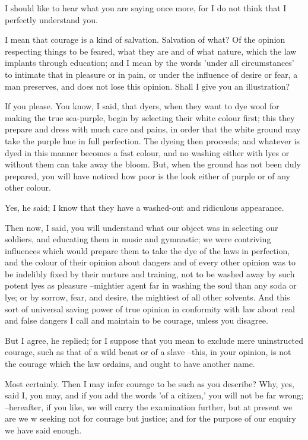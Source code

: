 I should like to hear what you are saying once more, for I do not think that I perfectly understand you.

I mean that courage is a kind of salvation.
Salvation of what?
Of the opinion respecting things to be feared, what they are and of what nature, which the law implants through education; and I mean by the words 'under all circumstances' to intimate that in pleasure or in pain, or under the influence of desire or fear, a man preserves, and does not lose this opinion. Shall I give you an illustration?

If you please.
You know, I said, that dyers, when they want to dye wool for making the true sea-purple, begin by selecting their white colour first; this they prepare and dress with much care and pains, in order that the white ground may take the purple hue in full perfection. The dyeing then proceeds; and whatever is dyed in this manner becomes a fast colour, and no washing either with lyes or without them can take away the bloom. But, when the ground has not been duly prepared, you will have noticed how poor is the look either of purple or of any other colour.

Yes, he said; I know that they have a washed-out and ridiculous appearance.

Then now, I said, you will understand what our object was in selecting our soldiers, and educating them in music and gymnastic; we were contriving influences which would prepare them to take the dye of the laws in perfection, and the colour of their opinion about dangers and of every other opinion was to be indelibly fixed by their nurture and training, not to be washed away by such potent lyes as pleasure --mightier agent far in washing the soul than any soda or lye; or by sorrow, fear, and desire, the mightiest of all other solvents. And this sort of universal saving power of true opinion in conformity with law about real and false dangers I call and maintain to be courage, unless you disagree.

But I agree, he replied; for I suppose that you mean to exclude mere uninstructed courage, such as that of a wild beast or of a slave --this, in your opinion, is not the courage which the law ordains, and ought to have another name.

Most certainly.
Then I may infer courage to be such as you describe?
Why, yes, said I, you may, and if you add the words 'of a citizen,' you will not be far wrong; --hereafter, if you like, we will carry the examination further, but at present we are we w seeking not for courage but justice; and for the purpose of our enquiry we have said enough.

